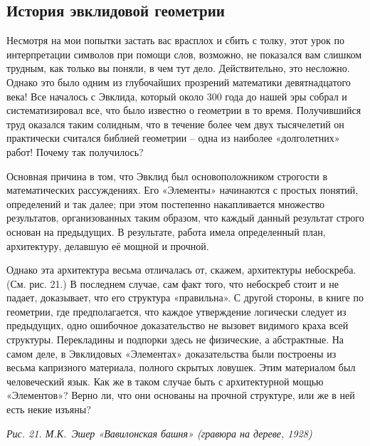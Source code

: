 \documentclass[../main.tex]{subfiles}
\begin{document}
\subsection{История эвклидовой геометрии}

Несмотря на мои попытки застать вас врасплох и сбить с толку, этот урок по интерпретации символов при помощи слов, возможно, не показался вам слишком трудным, как только вы поняли, в чем тут дело. Действительно, это несложно. Однако это было одним из глубочайших прозрений математики девятнадцатого века! Все началось с Эвклида, который около 300 года до нашей эры собрал и систематизировал все, что было известно о геометрии в то время. Получившийся труд оказался таким солидным, что в течение более чем двух тысячелетий он практически считался библией геометрии \--- одна из наиболее «долголетних» работ! Почему так получилось?

Основная причина в том, что Эвклид был основоположником строгости в математических рассуждениях. Его «Элементы» начинаются с простых понятий, определений и так далее; при этом постепенно накапливается множество результатов, организованных таким образом, что каждый данный результат строго основан на предыдущих. В результате, работа имела определенный план, архитектуру, делавшую её мощной и прочной.

Однако эта архитектура весьма отличалась от, скажем, архитектуры небоскреба. (См. рис. 21.) В последнем случае, сам факт того, что небоскреб стоит и не падает, доказывает, что его структура «правильна». С другой стороны, в книге по геометрии, где предполагается, что каждое утверждение логически следует из предыдущих, одно ошибочное доказательство не вызовет видимого краха всей структуры. Перекладины и подпорки здесь не физические, а абстрактные. На самом деле, в Эвклидовых «Элементах» доказательства были построены из весьма капризного материала, полного скрытых ловушек. Этим материалом был человеческий язык. Как же в таком случае быть с архитектурной мощью «Элементов»? Верно ли, что они основаны на прочной структуре, или же в ней есть некие изъяны?

\emph{Рис. 21. М.К.~Эшер «Вавилонская башня» (гравюра на дереве, 1928)}
\end{document}
